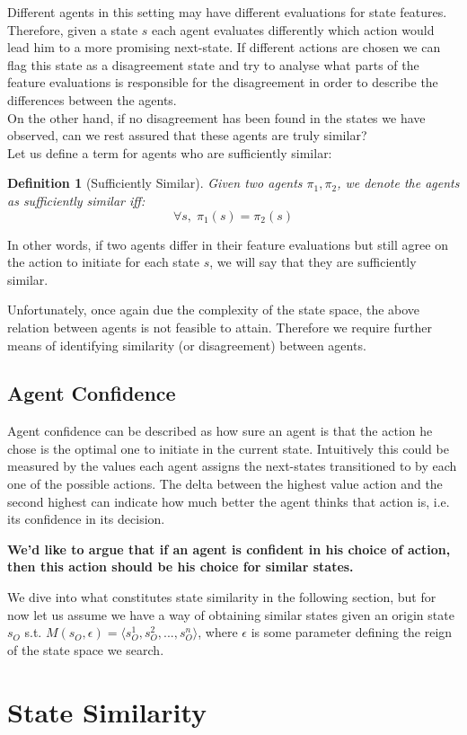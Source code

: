 \documentclass{article}
\newtheorem{definition}{Definition}
\begin{document}
Different agents in this setting may have different evaluations for state features. Therefore, given
a state $s$ each agent evaluates differently which action would lead him to a more promising
next-state. If different actions are chosen we can flag this state as a disagreement state and try
to analyse what parts of the feature evaluations is responsible for the disagreement in order to
describe the differences between the agents.\\
On the other hand, if no disagreement has been found in
the states we have observed, can we rest assured that these agents are truly similar?\\
Let us define a term for agents who are sufficiently similar:

\begin{definition}[Sufficiently Similar]
    Given two agents $\pi_1,\pi_2$, we denote the agents as sufficiently similar iff:  
    \[\forall s, \; \pi_1(s) = \pi_2(s)\] 
\end{definition} 
In other words, if two agents differ in their feature evaluations but still agree on the action to
initiate for each state $s$, we will say that they are sufficiently similar.


Unfortunately, once again due the complexity of the state space, the above relation between agents
is not feasible to attain. Therefore we require further means of identifying similarity (or
disagreement) between agents. 

\subsection{Agent Confidence}
Agent confidence can be described as how sure an agent is that the action he chose is the optimal
one to initiate in the current state. 
Intuitively this could be measured by the values each agent assigns the next-states transitioned to by
each one of the possible actions. The delta between the highest value action and the second
highest can indicate how much better the agent thinks that action is, i.e. its confidence in its
decision. 


\textbf{We'd like to argue that if an agent is confident in his choice of action, then this action
should be his choice for similar states.}

We dive into what constitutes state similarity in the following section, but for now let us assume
we have a way of obtaining similar states given an origin state $s_O$ s.t. $M(s_O, \epsilon) = \langle
s^1_O,s^2_O, ..., s^n_O \rangle$, where $\epsilon$ is some parameter defining the reign of the state
space we search.


\section{State Similarity}
\end{document}
